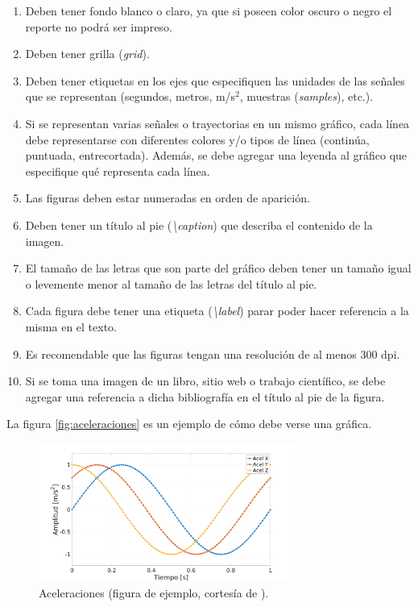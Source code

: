 \documentclass{article}
\begin{document}
\begin{enumerate}

    \item Deben tener fondo blanco o claro, ya que si poseen color oscuro o negro el reporte no podrá ser impreso.

    \item Deben tener grilla (\emph {grid}).

    \item Deben tener etiquetas en los ejes que especifiquen las unidades de las señales que se representan (segundos, metros, m/s$^2$, muestras (\emph{samples}), etc.).

    \item Si se representan varias señales o trayectorias en un mismo gráfico, cada línea debe representarse con diferentes colores y/o tipos de línea (continúa, puntuada, entrecortada). Además, se debe agregar una leyenda al gráfico que especifique qué representa cada línea.

    \item Las figuras deben estar numeradas en orden de aparición.

    \item Deben tener un título al pie (\emph{\textbackslash caption}) que describa el contenido de la imagen.

    \item El tamaño de las letras que son parte del gráfico deben tener un tamaño igual o levemente menor al tamaño de las letras del título al pie.

    \item Cada figura debe tener una etiqueta (\emph{\textbackslash label}) parar poder hacer referencia a la misma en el texto.

    \item Es recomendable que las figuras tengan una resolución de al menos 300 dpi.

    \item Si se toma una imagen de un libro, sitio web o trabajo científico, se debe agregar una referencia a dicha bibliografía en el título al pie de la figura.

\end{enumerate}

La figura \ref{fig:aceleraciones} es un ejemplo de cómo debe verse una gráfica.

\begin{figure}[H]
    \centering
    \includegraphics[width=0.75\textwidth]{aceleraciones}
    \caption{Aceleraciones (figura de ejemplo, cortesía de \cite{Gonzalez2019}).}
\end{figure}
\end{document}
